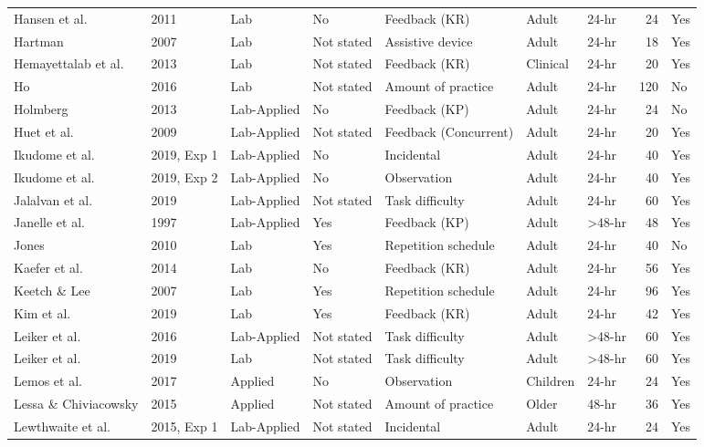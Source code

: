 \documentclass[
  english,
  man, donotrepeattitle,floatsintext]{apa7}
\begin{document}
\begin{landscape}
\begin{ThreePartTable}
\begin{longtable}[l]{lllllllrl}
\addlinespace
Hansen et al. & 2011 & Lab & No & Feedback (KR) & Adult & 24-hr & 24 & Yes\\
\addlinespace
Hartman & 2007 & Lab & Not stated & Assistive device & Adult & 24-hr & 18 & Yes\\
\addlinespace
Hemayettalab et al. & 2013 & Lab & Not stated & Feedback (KR) & Clinical & 24-hr & 20 & Yes\\
\addlinespace
Ho & 2016 & Lab & Not stated & Amount of practice & Adult & 24-hr & 120 & No\\
\addlinespace
Holmberg & 2013 & Lab-Applied & No & Feedback (KP) & Adult & 24-hr & 24 & No\\
\addlinespace
Huet et al. & 2009 & Lab-Applied & Not stated & Feedback (Concurrent) & Adult & 24-hr & 20 & Yes\\
\addlinespace
Ikudome et al. & 2019, Exp 1 & Lab-Applied & No & Incidental & Adult & 24-hr & 40 & Yes\\
\addlinespace
Ikudome et al. & 2019, Exp 2 & Lab-Applied & No & Observation & Adult & 24-hr & 40 & Yes\\
\addlinespace
Jalalvan et al. & 2019 & Lab-Applied & Not stated & Task difficulty & Adult & 24-hr & 60 & Yes\\
\addlinespace
Janelle et al. & 1997 & Lab-Applied & Yes & Feedback (KP) & Adult & >48-hr & 48 & Yes\\
\addlinespace
Jones & 2010 & Lab & Yes & Repetition schedule & Adult & 24-hr & 40 & No\\
\addlinespace
Kaefer et al. & 2014 & Lab & No & Feedback (KR) & Adult & 24-hr & 56 & Yes\\
\addlinespace
Keetch \& Lee & 2007 & Lab & Yes & Repetition schedule & Adult & 24-hr & 96 & Yes\\
\addlinespace
Kim et al. & 2019 & Lab & Yes & Feedback (KR) & Adult & 24-hr & 42 & Yes\\
\addlinespace
Leiker et al. & 2016 & Lab-Applied & Not stated & Task difficulty & Adult & >48-hr & 60 & Yes\\
\addlinespace
Leiker et al. & 2019 & Lab & Not stated & Task difficulty & Adult & >48-hr & 60 & Yes\\
\addlinespace
Lemos et al. & 2017 & Applied & No & Observation & Children & 24-hr & 24 & Yes\\
\addlinespace
Lessa \& Chiviacowsky & 2015 & Applied & Not stated & Amount of practice & Older & 48-hr & 36 & Yes\\
\addlinespace
Lewthwaite et al. & 2015, Exp 1 & Lab-Applied & Not stated & Incidental & Adult & 24-hr & 24 & Yes\\

\end{longtable}
\end{ThreePartTable}
\end{landscape}
\end{document}
